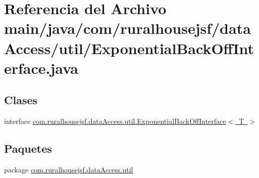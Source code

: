 \hypertarget{a00026}{}\section{Referencia del Archivo main/java/com/ruralhousejsf/data\+Access/util/\+Exponential\+Back\+Off\+Interface.java}
\label{a00026}
\subsection*{Clases}
\begin{DoxyCompactItemize}
\item 
interface \mbox{\hyperlink{a00160}{com.\+ruralhousejsf.\+data\+Access.\+util.\+Exponential\+Back\+Off\+Interface$<$ T $>$}}
\end{DoxyCompactItemize}
\subsection*{Paquetes}
\begin{DoxyCompactItemize}
\item 
package \mbox{\hyperlink{a00113}{com.\+ruralhousejsf.\+data\+Access.\+util}}
\end{DoxyCompactItemize}
